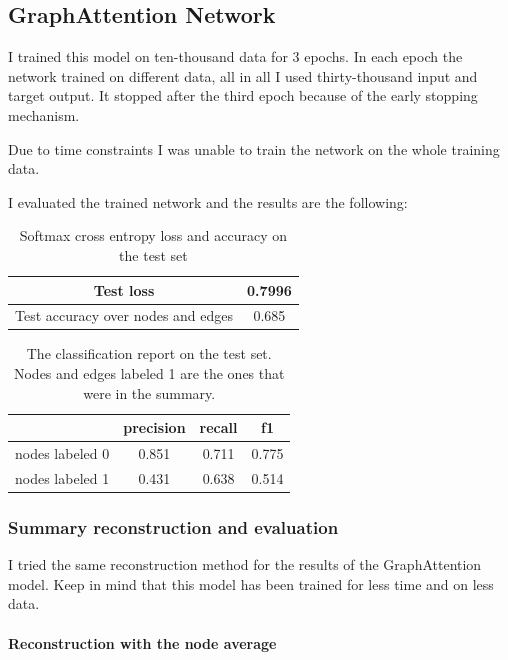 \subsection{GraphAttention Network}

I trained this model on ten-thousand data for 3 epochs. In each epoch the network trained on different data, all in all I used thirty-thousand input and target output. It stopped after the third epoch because of the early stopping mechanism.

Due to time constraints I was unable to train the network on the whole training data.

I evaluated the trained network and the results are the following:

\begin{table}[!h]
	\centering
	\begin{tabular}{| c | c |}
		\hline
		Test loss & 0.7996 \\ \hline
		Test accuracy over nodes and edges& 0.685 \\ \hline
	\end{tabular}
	\caption{Softmax cross entropy loss and accuracy on the test set}
\end{table}

\begin{table}[!h]
	\centering
	\begin{tabular}{| c | c | c | c |}
		\hline
		& precision & recall & f1 \\ \hline \hline
		nodes labeled 0 & 0.851 & 0.711 & 0.775 \\ \hline
		nodes labeled 1 & 0.431 & 0.638 & 0.514 \\ \hline
	\end{tabular}
	\caption{The classification report on the test set. Nodes and edges labeled 1 are the ones that were in the summary.}
\end{table}

\subsubsection{Summary reconstruction and evaluation}
I tried the same reconstruction method for the results of the GraphAttention model. Keep in mind that this model has been trained for less time and on less data.

\paragraph{Reconstruction with the node average}

